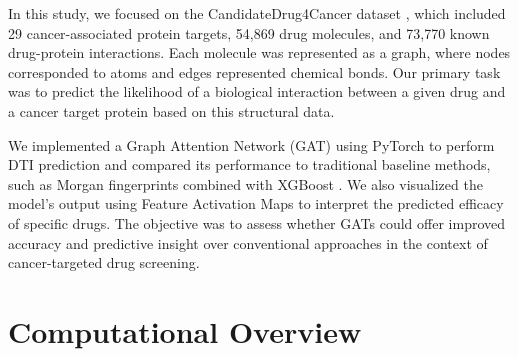 \documentclass[fontsize=11pt]{article}
\begin{document}
In this study, we focused on the CandidateDrug4Cancer dataset \cite{Ye2022}, which included 29 cancer-associated protein targets, 54,869 drug molecules, and 73,770 known drug-protein interactions. Each molecule was represented as a graph, where nodes corresponded to atoms and edges represented chemical bonds. Our primary task was to predict the likelihood of a biological interaction between a given drug and a cancer target protein based on this structural data.

We implemented a Graph Attention Network (GAT) using PyTorch \cite{Velickovic2018} to perform DTI prediction and compared its performance to traditional baseline methods, such as Morgan fingerprints \cite{Rogers2010} combined with XGBoost \cite{ChenGuestrin2016}. We also visualized the model’s output using Feature Activation Maps \cite{Pope2019} to interpret the predicted efficacy of specific drugs. The objective was to assess whether GATs could offer improved accuracy and predictive insight over conventional approaches in the context of cancer-targeted drug screening.

\section*{Computational Overview}
\end{document}
